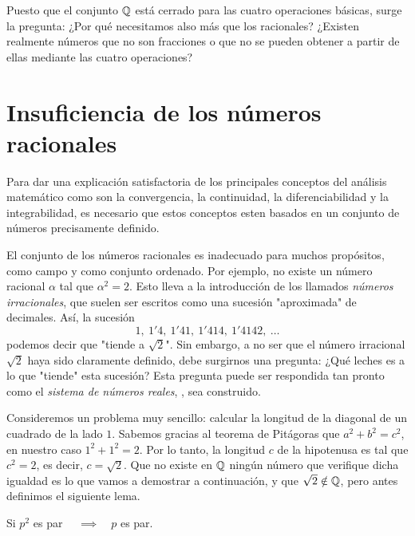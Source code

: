Puesto que el conjunto $\mathbb{Q}$ está cerrado para las cuatro operaciones básicas, surge la pregunta: ¿Por qué necesitamos also más que los racionales? ¿Existen realmente números que no son fracciones o que no se pueden obtener a partir de ellas mediante las cuatro operaciones?

\section{Insuficiencia de los números racionales}
Para dar una explicación satisfactoria de los principales conceptos del análisis matemático como son la convergencia, la continuidad, la diferenciabilidad y la integrabilidad, es necesario que estos conceptos esten basados en un conjunto de números precisamente definido.

El conjunto de los números racionales es inadecuado para muchos propósitos, como campo y como conjunto ordenado. Por ejemplo, no existe un número racional $\alpha$ tal que $\alpha^2 = 2$. Esto lleva a la introducción de los llamados \textit{números irracionales}, que suelen ser escritos como una sucesión "aproximada" de decimales. Así, la sucesión
\begin{equation}
    1,\ 1'4,\ 1'41,\ 1'414,\ 1'4142,\ \ldots
\end{equation}
podemos decir que "tiende a $\sqrt{2}$". Sin embargo, a no ser que el número irracional $\sqrt{2}$ haya sido claramente definido, debe surgirnos una pregunta: ¿Qué leches es a lo que "tiende" esta sucesión? Esta pregunta puede ser respondida tan pronto como el \textit{sistema de números reales}, \R,  sea construido.

Consideremos un problema muy sencillo: calcular la longitud de la diagonal de un cuadrado de la lado $1$. Sabemos gracias al teorema de Pitágoras que $a^2 + b^2 = c^2$, en nuestro caso $1^2 + 1^2 = 2$. Por lo tanto, la longitud $c$ de la hipotenusa es tal que $c^2 = 2$, es decir, $c = \sqrt{2}$. Que no existe en $\mathbb{Q}$ ningún número que verifique dicha igualdad es lo que vamos a demostrar a continuación, y que $\sqrt{2}\notin\mathbb{Q}$, pero antes definimos el siguiente lema.

\begin{lemma}
    Si $p^2$ es par $\quad\implies\quad p$ es par.
\end{lemma}

